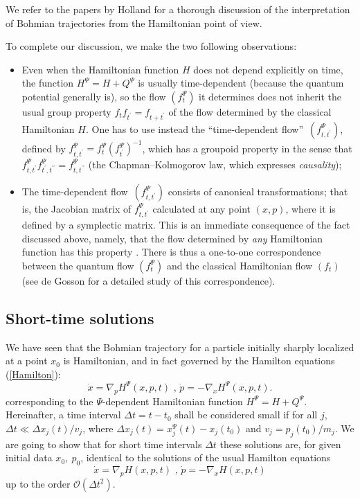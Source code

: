 \documentclass[12pt]{article}%
\begin{document}
We refer to the papers by Holland \cite{Holland1,Holland2} for a thorough
discussion of the interpretation of Bohmian trajectories from the Hamiltonian
point of view.

To complete our discussion, we make the two following observations:

\begin{itemize}
\item Even when the Hamiltonian function $H$ does not depend explicitly on
time, the function $H^{\Psi}=H+Q^{\Psi}$ is usually time-dependent (because
the quantum potential generally is), so the flow $(f_{t}^{\Psi})$ it
determines does not inherit the usual group property $f_{t}f_{t^{\prime}%
}=f_{t+t^{\prime}}$ of the flow determined by the classical Hamiltonian $H$.
One has to use instead the \textquotedblleft time-dependent
flow\textquotedblright\ $(f_{t,t^{\prime}}^{\Psi})$, defined by
$f_{t,t^{\prime}}^{\Psi}=f_{t}^{\Psi}(f_{t^{\prime}}^{\Psi})^{-1}$, which has
a groupoid property \cite{AM,AMR} in the sense that $f_{t,t^{\prime}}^{\Psi
}f_{t^{\prime},t^{\prime\prime}}^{\Psi}=f_{t,t^{\prime\prime}}^{\Psi}$ (the
Chapman--Kolmogorov law, which expresses \emph{causality});

\item The time-dependent flow\ $(f_{t,t^{\prime}}^{\Psi})$ consists of
canonical transformations; that is, the Jacobian matrix of $f_{t,t^{\prime}%
}^{\Psi}$ calculated at any point $(x,p)$, where it is defined by a symplectic
matrix. This is an immediate consequence of the fact discussed above, namely,
that the flow determined by \emph{any} Hamiltonian function has this property
\cite{Arnold,HGoldstein,ICP,Birk}. There is thus a one-to-one correspondence
between the quantum flow $(f_{t}^{\Psi})$ and the classical Hamiltonian flow
$(f_{t})$ (see de Gosson \cite{go15} for a detailed study of this correspondence).
\end{itemize}

\subsection{Short-time solutions}

We have seen that the Bohmian trajectory for a particle initially sharply
localized at a point $x_{0}$ is Hamiltonian, and in fact governed by the
Hamilton equations (\ref{Hamilton}):%
\begin{equation}
\dot{x}=\nabla_{p}H^{\Psi}(x,p,t)\text{ \ , \ }\dot{p}=-\nabla_{x}H^{\Psi
}(x,p,t). \label{hameq}%
\end{equation}
corresponding to the $\Psi$-dependent Hamiltonian function $H^{\Psi}%
=H+Q^{\Psi}$. Hereinafter, a time interval $\Delta t=t-t_{0}$ shall be
considered small if for all $j$, $\Delta t \ll\Delta x_{j}(t)/v_{j}$, where
$\Delta x_{j}(t)=x_{j}^{\Psi}(t)-x_{j}(t_{0})$ and $v_{j}=p_{j}(t_{0})/m_{j}$.
We are going to show that for short time intervals $\Delta t$ these solutions
are, for given initial data $x_{0},~p_{0}$, identical to the solutions of the
usual Hamilton equations%
\[
\dot{x}=\nabla_{p}H(x,p,t)\text{ \ , \ }\dot{p}=-\nabla_{x}H(x,p,t)
\]
up to the order $\mathcal{O}(\Delta t^{2})$.
\end{document}
